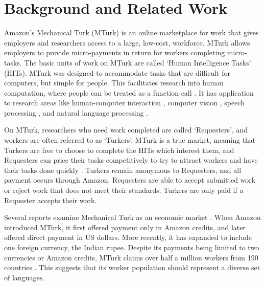 \documentclass[11pt]{article}
\begin{document}
\section{Background and Related Work}
Amazon's Mechanical Turk (MTurk) is an online marketplace for work that gives employers and researchers access to a large, low-cost, workforce. MTurk allows employers to provide micro-payments in return for workers completing micro-tasks.  The basic units of work on MTurk are called `Human Intelligence Tasks' (HITs).  MTurk was designed to accommodate tasks that are difficult for computers, but simple for people. This facilitates research into human computation, where people can be treated as a function call \cite{vonAhnThesis,Little2009,quinn-bederson:2011}.  It has application to research areas like human-computer interaction \cite{bigham-et-al:2010,bernstein-et-al:2010}, computer vision  \cite{sorkin-forsyth:2008,deng-et-al:2010,rashtchian:10}, speech processing \cite{marge:10,lane-EtAl:2010:MTURK,Parent-Eskenazi:2011,Eskenazi:2013:crowdsourcing-speech-book},  and natural language processing \cite{Snow2008,callisonburch-dredze:2010:MTURK,laws-scheible-schutze:2011:EMNLP}. 

\nocite{novotney-callisonburch:2010:NAACLHLT}

On MTurk, researchers who need work completed are called `Requesters', and workers are often referred to as `Turkers'.  MTurk is a true market, meaning that Turkers are free to choose to complete the HITs which interest them, and Requesters can price their tasks competitively to try to attract workers and have their tasks done quickly \cite{faridani-et-al:2011,singer-mittal:2011}. Turkers remain anonymous to Requesters, and all payment occurs through Amazon. Requesters are able to accept submitted work or reject work that does not meet their standards.  Turkers are only paid if a Requester accepts their work. 

Several reports examine Mechanical Turk as an economic market \cite{ipeirotis:2010:marketplace,lehdonvirta-ernkvist:2011}.  When Amazon introduced MTurk, it first offered payment only in Amazon credits, and later offered direct payment in US dollars. More recently, it has expanded to include one foreign currency, the Indian rupee. Despite its payments being limited to two currencies or Amazon credits, MTurk claims over half a million workers from 190 countries \cite{AmazonRequesterTour}.  This suggests that its worker population should represent a diverse set of languages.
\end{document}
